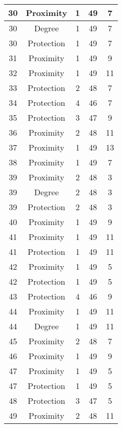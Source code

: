 \documentclass[results.tex]{subfiles}
\begin{document}
\begin{center}
\begin{tabular}{| c || c | c | c | c |}
    30 & Proximity & 1 & 49 & 7 \\ 
    \hline
    30 & Degree & 1 & 49 & 7 \\ 
    \hline
    30 & Protection & 1 & 49 & 7 \\ 
    \hline
    31 & Proximity & 1 & 49 & 9 \\ 
    \hline
    32 & Proximity & 1 & 49 & 11 \\ 
    \hline
    33 & Protection & 2 & 48 & 7 \\ 
    \hline
    34 & Protection & 4 & 46 & 7 \\ 
    \hline
    35 & Protection & 3 & 47 & 9 \\ 
    \hline
    36 & Proximity & 2 & 48 & 11 \\ 
    \hline
    37 & Proximity & 1 & 49 & 13 \\ 
    \hline
    38 & Proximity & 1 & 49 & 7 \\ 
    \hline
    39 & Proximity & 2 & 48 & 3 \\ 
    \hline
    39 & Degree & 2 & 48 & 3 \\ 
    \hline
    39 & Protection & 2 & 48 & 3 \\ 
    \hline
    40 & Proximity & 1 & 49 & 9 \\ 
    \hline
    41 & Proximity & 1 & 49 & 11 \\ 
    \hline
    41 & Protection & 1 & 49 & 11 \\ 
    \hline
    42 & Proximity & 1 & 49 & 5 \\ 
    \hline
    42 & Protection & 1 & 49 & 5 \\ 
    \hline
    43 & Protection & 4 & 46 & 9 \\ 
    \hline
    44 & Proximity & 1 & 49 & 11 \\ 
    \hline
    44 & Degree & 1 & 49 & 11 \\ 
    \hline
    45 & Proximity & 2 & 48 & 7 \\ 
    \hline
    46 & Proximity & 1 & 49 & 9 \\ 
    \hline
    47 & Proximity & 1 & 49 & 5 \\ 
    \hline
    47 & Protection & 1 & 49 & 5 \\ 
    \hline
    48 & Protection & 3 & 47 & 5 \\ 
    \hline
    49 & Proximity & 2 & 48 & 11 \\ 
    \hline   \end{tabular}
\end{center}
\end{document}
